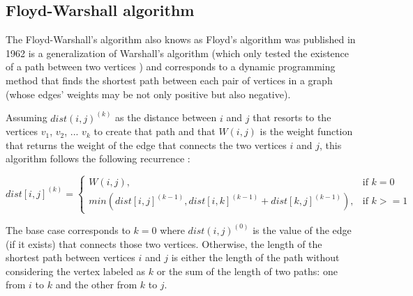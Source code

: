 \subsection{Floyd-Warshall algorithm} \label{algorithm-shortestpath-floydwarshall}
The Floyd-Warshall's algorithm also knows as Floyd's algorithm was published in 1962 is a generalization of Warshall's algorithm 
(which only tested the existence of a path between two vertices \cite[p.~346]{floyd-alg}) and corresponds to a dynamic programming method 
that finds the shortest path between each pair of vertices in a graph (whose edges' weights may be not only positive but also negative).\par
Assuming $dist(i, j)^{(k)}$ as the distance between $i$ and $j$ that resorts to the vertices $v_{1}$, $v_{2}$, ... $v_{k}$ to create that path
and that $W(i,j)$ is the weight function that returns the weight of the edge that connects the two vertices $i$ and $j$,
this algorithm follows the following recurrence \cite[p.~694]{intro-alg}:

\begin{equation}
    dist[i,j]^{(k)}=\begin{cases}
      W(i,j), & \text{if $k=0$}\\
      min(dist[i,j]^{(k-1)}, dist[i,k]^{(k-1)} + dist[k,j]^{(k-1)}), & \text{if $k>=1$}
    \end{cases}
\end{equation}

The base case corresponds to $k=0$ where $dist(i, j)^{(0)}$ is the value of the edge (if it exists) that connects those two vertices.
Otherwise, the length of the shortest path between vertices $i$ and $j$ is either the length of the path without considering the vertex
labeled as $k$ or the sum of the length of two paths: one from $i$ to $k$ and the other from $k$ to $j$.

